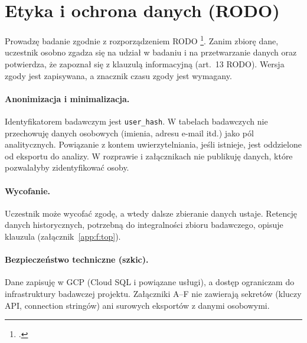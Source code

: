 \section{Etyka i ochrona danych (RODO)}
\label{ch06:sec:etyka}

Prowadzę badanie zgodnie z rozporządzeniem RODO \footcite{eu2016gdpr}. Zanim zbiorę dane, uczestnik osobno zgadza się na udział w badaniu i na przetwarzanie danych oraz potwierdza, że zapoznał się z klauzulą informacyjną (art.~13 RODO). Wersja zgody jest zapisywana, a znacznik czasu zgody jest wymagany.

\paragraph{Anonimizacja i minimalizacja.}
Identyfikatorem badawczym jest \texttt{user\_hash}. W tabelach badawczych nie przechowuję danych osobowych (imienia, adresu e-mail itd.) jako pól analitycznych. Powiązanie z kontem uwierzytelniania, jeśli istnieje, jest oddzielone od eksportu do analizy. W rozprawie i załącznikach nie publikuję danych, które pozwalałyby zidentyfikować osoby.

\paragraph{Wycofanie.}
Uczestnik może wycofać zgodę, a wtedy dalsze zbieranie danych ustaje. Retencję danych historycznych, potrzebną do integralności zbioru badawczego, opisuje klauzula (załącznik~\ref{app:f:top}).

\paragraph{Bezpieczeństwo techniczne (szkic).}
Dane zapisuję w GCP (Cloud SQL i powiązane usługi), a dostęp ograniczam do infrastruktury badawczej projektu. Załączniki A--F nie zawierają sekretów (kluczy API, connection stringów) ani surowych eksportów z danymi osobowymi.
